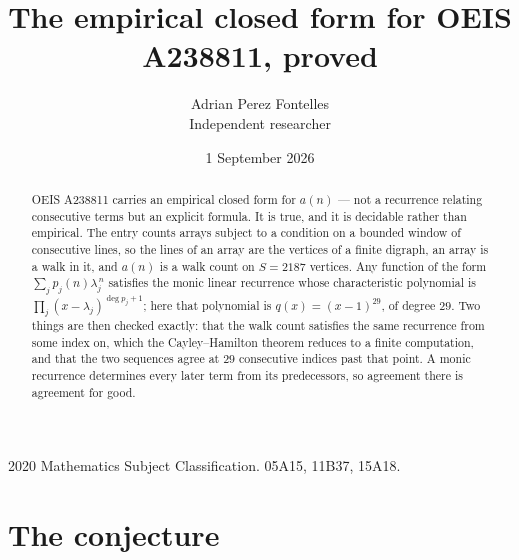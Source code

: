 \documentclass[11pt,a4paper]{article}
\title{The empirical closed form for OEIS A238811, proved}
\author{Adrian Perez Fontelles\\ \small Independent researcher}
\date{1 September 2026}
\theoremstyle{plain}
\theoremstyle{definition}
\begin{document}
\maketitle

\begin{abstract}
OEIS A238811 carries an empirical closed form for $a(n)$ --- not a recurrence relating
consecutive terms but an explicit formula. It is true, and it is decidable rather than
empirical. The entry counts arrays subject to a condition on a bounded window of consecutive lines, so the lines of an array are the
vertices of a finite digraph, an array is a walk in it, and $a(n)$ is a walk count on
$S=2187$ vertices. Any function of the form $\sum_j p_j(n)\lambda_j^{\,n}$ satisfies the
monic linear recurrence whose characteristic polynomial is
$\prod_j(x-\lambda_j)^{\deg p_j+1}$; here that polynomial is $q(x)=(x-1)^{29}$, of degree
$29$. Two things are then checked exactly: that the walk count satisfies the same
recurrence from some index on, which the Cayley--Hamilton theorem reduces to a finite
computation, and that the two sequences agree at $29$ consecutive indices past that
point. A monic recurrence determines every later term from its predecessors, so agreement
there is agreement for good.
\end{abstract}

\noindent\small 2020 Mathematics Subject Classification. 05A15, 11B37, 15A18.\normalsize

\section{The conjecture}
\end{document}

